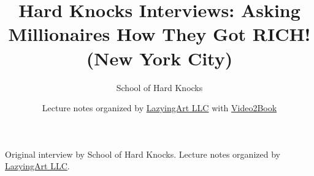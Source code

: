 \documentclass[11pt,oneside]{book}
\begin{document}
\frontmatter
\title{Hard Knocks Interviews: Asking Millionaires How They Got RICH! (New York City)}
\author{School of Hard Knocks}
\date{Lecture notes organized by \href{https://lazying.art}{LazyingArt LLC} with \href{https://github.com/lachlanchen/Video2Book}{Video2Book}}
\maketitle
\begin{center}
\small Original interview by School of Hard Knocks. Lecture notes organized by \href{https://lazying.art}{LazyingArt LLC}.
\end{center}
\clearpage
\mainmatter

\end{document}
